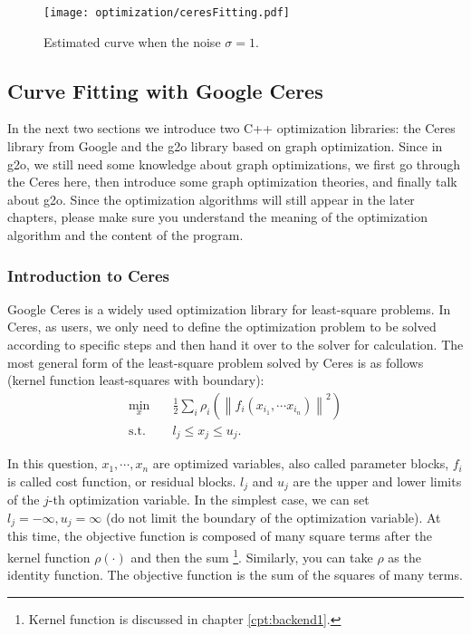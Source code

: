 \begin{figure}[!ht]
    \centering
    \texttt{[image: optimization/ceresFitting.pdf]}
    \caption{Estimated curve when the noise $\sigma=1$. }
    \label{fig:ceres-fitting}
\end{figure}

\subsection{Curve Fitting with Google Ceres}
In the next two sections we introduce two C++ optimization libraries: the Ceres library \cite{Ceres} from Google and the g2o library \cite{Kummerle2011} based on graph optimization. Since in g2o, we still need some knowledge about graph optimizations, we first go through the Ceres here, then introduce some graph optimization theories, and finally talk about g2o. Since the optimization algorithms will still appear in the later chapters, please make sure you understand the meaning of the optimization algorithm and the content of the program.

\subsubsection{Introduction to Ceres}
Google Ceres is a widely used optimization library for least-square problems. In Ceres, as users, we only need to define the optimization problem to be solved according to specific steps and then hand it over to the solver for calculation. The most general form of the least-square problem solved by Ceres is as follows (kernel function least-squares with boundary):
\begin{equation}
    \begin{array}{ll}
        \min \limits_x \quad & \frac{1}{2}\sum\limits_i {{\rho _i}\left( {{{\left\| {{f_i}\left( {{x_{{i_1}}}, \cdots {x_{{i_n}}}} \right)} \right\|}^2}} \right)} \\
        \mathrm{s.t.} \quad & {l_j} \leqslant {x_j} \leqslant {u_j}.
    \end{array}
\end{equation}

In this question, $x_1, \cdots, x_n$ are optimized variables, also called parameter blocks, $f_i$ is called cost function, or residual blocks. $l_j$ and $u_j$ are the upper and lower limits of the $j$-th optimization variable. In the simplest case, we can set $l_j = -\infty, u_j=\infty$ (do not limit the boundary of the optimization variable). At this time, the objective function is composed of many square terms after the kernel function $\rho(\cdot)$ and then the sum \footnote{Kernel function is discussed in chapter \ref{cpt:backend1}. }. Similarly, you can take $\rho$ as the identity function. The objective function is the sum of the squares of many terms.

